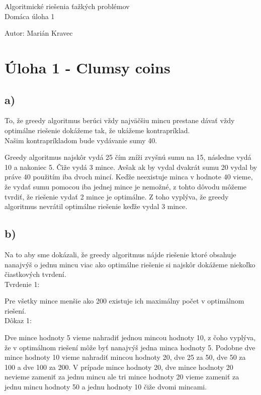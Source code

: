 \documentclass[a4paper]{article}
\begin{document}
 
	
\pagestyle{plain}

\begin{center}
	\sc\large
	Algoritmické riešenia ťažkých problémov\\
	Domáca úloha 1
\end{center}

Autor: Marián Kravec

\section{Úloha 1 - Clumsy coins}

\subsection*{a)}

To, že greedy algoritmus berúci vždy najväčšiu mincu prestane dávať vždy optimálne riešenie dokážeme tak, že ukážeme kontrapríklad.
\\

Našim kontrapríkladom bude vydávanie sumy 40.

Greedy algoritmus najskôr vydá 25 čím zníži zvyšnú sumu na 15, následne vydá 10 a nakoniec 5. Čiže vydá 3 mince. Avšak ak by vydal dvakrát sumu 20 vydal by práve 40 použitím iba dvoch mincí. Keďže neexistuje minca v hodnote 40 vieme, že vydať sumu pomocou iba jednej mince je nemožné, z tohto dôvodu môžeme tvrdiť, že riešenie vydať 2 mince je optimálne. Z toho vyplýva, že greedy algoritmus nevrátil optimálne riešenie keďže vydal 3 mince.

\subsection*{b)}

Na to aby sme dokázali, že greedy algoritmus nájde riešenie ktoré obsahuje nanajvýš o jednu mincu viac ako optimálne riešenie si najskôr dokážeme niekoľko čiastkových tvrdení.
\\

Tvrdenie 1:

Pre všetky mince menšie ako 200 existuje ich maximálny počet v optimálnom riešení.
\\

Dôkaz 1:

Dve mince hodnoty 5 vieme nahradiť jednou mincou hodnoty 10, z čoho vyplýva, že v optimálnom riešení môže byť nanajvýš jedna minca hodnoty 5. Podobne dve mince hodnoty 10 vieme nahradiť mincou hodnoty 20, dve 25 za 50, dve 50 za 100 a dve 100 za 200. V prípade mince hodnoty 20, dve mince hodnoty 20 nevieme zameniť za jednu mincu ale tri mince hodnoty 20 vieme zameniť za jednu mincu hodnoty 50 a jednu hodnoty 10 čiže dvomi mincami. 
\\
\end{document}
